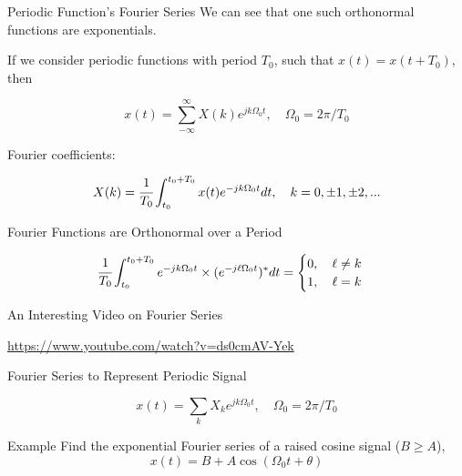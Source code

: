 \documentclass[aspectratio=169,xcolor=dvipsnames,svgnames,x11names,fleqn]{beamer}
\begin{document}
\begin{frame}{Periodic Function’s Fourier Series}
    We can see that one such orthonormal functions are exponentials.

If we consider periodic functions with period $T_0$, such that $x(t) = x(t + T_0)$, then

$$
x(t) = \sum_{-\infty}^\infty X(k) e^{jk\Omega_0 t}, \quad \Omega_0 = 2\pi / T_0
$$

Fourier coefficients:

$$
X(k) = \cfrac{1}{T_0}\int_{t_0}^{t_0 + T_0}x(t)  e^{-jk\Omega_0 t}dt, \quad k = 0, \pm 1 , \pm 2, ...
$$
\end{frame}

\begin{frame}{Fourier Functions are Orthonormal over a Period}

\LARGE

    $$
    \cfrac{1}{T_0}\int_{t_0}^{t_0 + T_0}   e^{-jk\Omega_0 t} \times (e^{-j\ell \Omega_0 t})^* dt = \begin{cases}
    0 , \quad \ell \neq k\\
    1, \quad \ell = k
\end{cases}
    $$
\end{frame}

\begin{frame}{An Interesting Video on Fourier Series}

\LARGE

\begin{center}
    \url{https://www.youtube.com/watch?v=ds0cmAV-Yek}
\end{center}
    
\end{frame}


\begin{frame}{Fourier Series to Represent Periodic Signal}

\LARGE 
    $$
    x(t) = \sum_k X_k e^{jk\Omega_0 t }, \quad  \Omega_0 = 2\pi/ T_0
    $$
\end{frame}


\begin{frame}{Example}
    Find the exponential Fourier series of a raised cosine signal ($B \geq A$),
$$
x(t) = B + A\cos(\Omega_0 t + \theta)
$$
\end{frame}

\begin{frame}{}
\vspace*{-9\baselineskip}
    \color{LightGray}{Blank space for calculation}
\end{frame}
\end{document}
